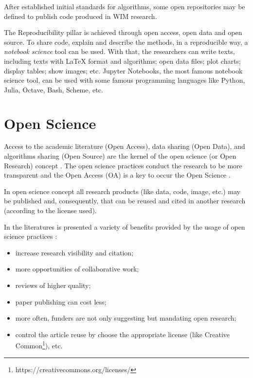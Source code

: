 \documentclass[a4paper]{article}
\begin{document}
{After established initial standards for algorithms, some open repositories may be defined to publish code produced in WIM research. 

The Reproducibility pillar is achieved through open access, open data and open source. To share code, explain and describe the methods, in a reproducible way, a \textit{notebook science} tool can be used. With that, the researchers can write texts, including texts with LaTeX format and algorithms; open data files; plot charts; display tables; show images; etc. Jupyter Notebooks, the most famous notebook science tool, can be used with some famous programming languages like Python, Julia, Octave, Bash, Scheme, etc.

\section{Open Science}\label{open-science}

Access to the academic literature (Open Access), data sharing (Open Data), and algorithms sharing (Open Source) are the kernel of the open science (or Open Research) concept \cite{article:the-open-research-value-proposition}. The open science practices conduct the research to be more transparent \cite{dorch2015open} and the Open Access (OA) is a key to occur the Open Science \cite{margoni2016open}.


In open science concept all research products (like data, code, image, etc.) may be published and, consequently, that can be reused and cited in another research (according to the license used).

In the literatures is presented a variety of benefits provided by the usage of open science practices \cite{article:the-open-research-value-proposition}:

\begin{itemize}
\item increase research visibility and citation;
\item more opportunities of collaborative work;
\item reviews of higher quality;
\item paper publishing can cost less;
\item more often, funders are not only suggesting but mandating open research;
\item control the article reuse by choose the appropriate license (like Creative Common\footnote{https://creativecommons.org/licenses/}), etc.
\end{itemize}



}
\end{document}
